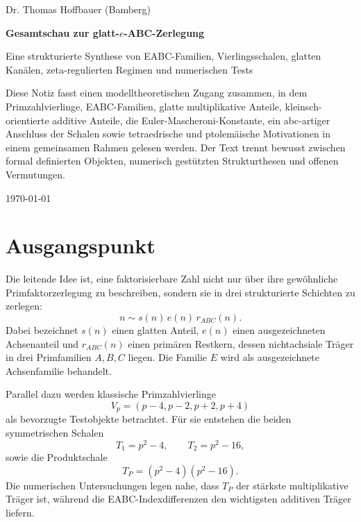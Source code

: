 \documentclass[11pt,a4paper]{article}
\theoremstyle{definition}
\begin{document}
\begin{titlepage}
\centering
{\Large Dr. Thomas Hoffbauer (Bamberg)\par}
\vspace{2cm}
{\huge\bfseries Gesamtschau zur glatt-$e$-ABC-Zerlegung\par}
\vspace{0.6cm}
{\Large Eine strukturierte Synthese von EABC-Familien, Vierlingsschalen, glatten Kanälen, zeta-regulierten Regimen und numerischen Tests\par}
\vspace{1.5cm}
\begin{minipage}{0.88\textwidth}
\small
Diese Notiz fasst einen modelltheoretischen Zugang zusammen, in dem Primzahlvierlinge, EABC-Familien, glatte multiplikative Anteile, kleinsch-orientierte additive Anteile, die Euler-Mascheroni-Konstante, ein abc-artiger Anschluss der Schalen sowie tetraedrische und ptolemäische Motivationen in einem gemeinsamen Rahmen gelesen werden. Der Text trennt bewusst zwischen formal definierten Objekten, numerisch gestützten Strukturthesen und offenen Vermutungen.
\end{minipage}
\vfill
{\large \today\par}
\end{titlepage}

\tableofcontents
\newpage

\section{Ausgangspunkt}

Die leitende Idee ist, eine faktorisierbare Zahl nicht nur über ihre gewöhnliche Primfaktorzerlegung zu beschreiben, sondern sie in drei strukturierte Schichten zu zerlegen:
\[
 n \sim s(n)\, e(n)\, r_{ABC}(n).
\]
Dabei bezeichnet $s(n)$ einen glatten Anteil, $e(n)$ einen ausgezeichneten Achsenanteil und $r_{ABC}(n)$ einen primären Restkern, dessen nichtachsiale Träger in drei Primfamilien $A,B,C$ liegen. Die Familie $E$ wird als ausgezeichnete Achsenfamilie behandelt.

Parallel dazu werden klassische Primzahlvierlinge
\[
V_p=(p-4,p-2,p+2,p+4)
\]
als bevorzugte Testobjekte betrachtet. Für sie entstehen die beiden symmetrischen Schalen
\[
T_1=p^2-4,\qquad T_2=p^2-16,
\]
sowie die Produktschale
\[
T_P=(p^2-4)(p^2-16).
\]
Die numerischen Untersuchungen legen nahe, dass $T_P$ der stärkste multiplikative Träger ist, während die EABC-Indexdifferenzen den wichtigsten additiven Träger liefern.
\end{document}
